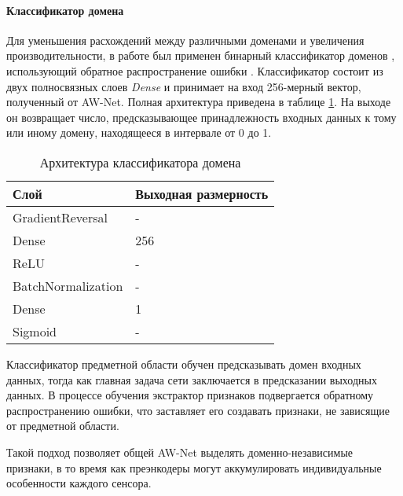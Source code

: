 \paragraph{Классификатор домена}

Для уменьшения расхождений между различными доменами и увеличения производительности, в работе был применен бинарный классификатор доменов \cite{ganin2016domain}, использующий обратное распространение ошибки \cite{ganin2015unsupervised}. Классификатор состоит из двух полносвязных слоев \textit{Dense} и принимает на вход 256-мерный вектор, полученный от AW-Net. Полная архитектура приведена в таблице \ref{domain-classifyer}. На выходе он возвращает число, предсказывающее принадлежность входных данных к тому или иному домену, находящееся в интервале от 0 до 1.

\begin{table}[H]
    \caption{Архитектура классификатора домена}\label{domain-classifyer}
    \begin{tabular}{|p{5cm}|p{5cm}|}
        \hline
        {Слой} & {Выходная размерность} \\
        \hline
        GradientReversal & - \\
        \hline
        Dense & 256 \\
        \hline
        ReLU & - \\
        \hline
        BatchNormalization & - \\
        \hline
        Dense & 1 \\
        \hline
        Sigmoid & - \\
        \hline
    \end{tabular}
\end{table}

Классификатор предметной области обучен предсказывать домен входных данных, тогда как главная задача сети заключается в предсказании выходных данных. В процессе обучения экстрактор признаков подвергается обратному распространению ошибки, что заставляет его создавать признаки, не зависящие от предметной области.

Такой подход позволяет общей AW-Net выделять доменно-независимые признаки, в то время как преэнкодеры могут аккумулировать индивидуальные особенности каждого сенсора.
